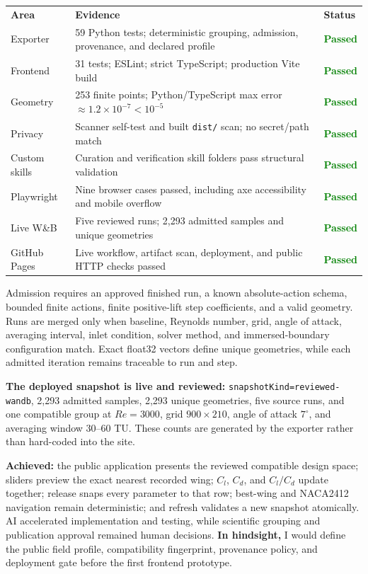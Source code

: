 \documentclass[10pt,a4paper]{article}
\newcommand{\sectiontitle}[1]{\vspace{3pt}{\color{Navy}\fontsize{11.2}{13}\selectfont\bfseries #1\par}\vspace{1pt}}
\newcommand{\smallbody}{\fontsize{8.55}{10.35}\selectfont}
\newcommand{\tinybody}{\fontsize{7.45}{9}\selectfont}
\newcommand{\statuspassed}{\textcolor{Green}{\bfseries Passed}}
\begin{document}
{\tinybody
{}
\begin{tabularx}{\textwidth}{@{}L{0.14\textwidth} Y C{0.13\textwidth}@{}}
\color{white}\bfseries Area & \color{white}\bfseries Evidence & \color{white}\bfseries Status \\
Exporter & 59 Python tests; deterministic grouping, admission, provenance, and declared profile & \statuspassed \\
Frontend & 31 tests; ESLint; strict TypeScript; production Vite build & \statuspassed \\
Geometry & 253 finite points; Python/TypeScript max error $\approx 1.2\times10^{-7}<10^{-5}$ & \statuspassed \\
Privacy & Scanner self-test and built \texttt{dist/} scan; no secret/path match & \statuspassed \\
Custom skills & Curation and verification skill folders pass structural validation & \statuspassed \\
Playwright & Nine browser cases passed, including axe accessibility and mobile overflow & \statuspassed \\
Live W\&B & Five reviewed runs; 2,293 admitted samples and unique geometries & \statuspassed \\
GitHub Pages & Live workflow, artifact scan, deployment, and public HTTP checks passed & \statuspassed \\
\end{tabularx}
}

\sectiontitle{Physical validity and limits}
{\smallbody
Admission requires an approved finished run, a known absolute-action schema, bounded finite actions, finite positive-lift step coefficients, and a valid geometry. Runs are merged only when baseline, Reynolds number, grid, angle of attack, averaging interval, inlet condition, solver method, and immersed-boundary configuration match. Exact float32 vectors define unique geometries, while each admitted iteration remains traceable to run and step.

\textbf{The deployed snapshot is live and reviewed:} \texttt{snapshotKind=reviewed-wandb}, 2,293 admitted samples, 2,293 unique geometries, five source runs, and one compatible group at $Re=3000$, grid $900\times210$, angle of attack $7^\circ$, and averaging window 30--60 TU. These counts are generated by the exporter rather than hard-coded into the site.
}

\sectiontitle{Reflection}
{\smallbody
\textbf{Achieved:} the public application presents the reviewed compatible design space; sliders preview the exact nearest recorded wing; $C_l$, $C_d$, and $C_l/C_d$ update together; release snaps every parameter to that row; best-wing and NACA2412 navigation remain deterministic; and refresh validates a new snapshot atomically. AI accelerated implementation and testing, while scientific grouping and publication approval remained human decisions. \textbf{In hindsight,} I would define the public field profile, compatibility fingerprint, provenance policy, and deployment gate before the first frontend prototype.
}
\end{document}
